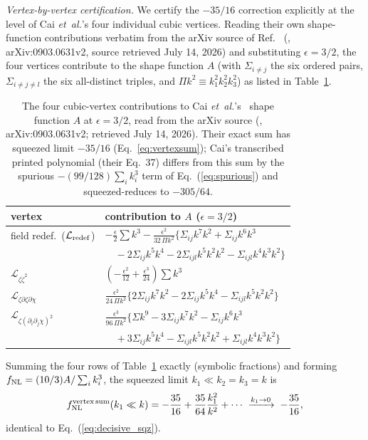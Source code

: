 \documentclass[aps,prd,twocolumn,superscriptaddress,showpacs,preprintnumbers,nofootinbib,longbibliography,floatfix]{revtex4-2}
\newcommand{\fnl}{f_{\rm NL}}
\newcommand{\etal}{\textit{et~al.}}
\begin{document}
\emph{Vertex-by-vertex certification.} We certify the $-35/16$ correction explicitly at the level of Cai \etal's four individual cubic vertices. Reading their own shape-function contributions verbatim from the arXiv source of Ref.~\cite{Cai:2009fn} (, arXiv:0903.0631v2, source retrieved July 14, 2026) and substituting $\epsilon=3/2$, the four vertices contribute to the shape function $A$ (with $\Sigma_{i\neq j}$ the six ordered pairs, $\Sigma_{i\neq j\neq l}$ the six all-distinct triples, and $\Pi k^2\equiv k_1^2k_2^2k_3^2$) as listed in Table~\ref{tab:vertices}.
\begin{table}[t]
\centering
\caption{\label{tab:vertices}The four cubic-vertex contributions to Cai \etal's~\cite{Cai:2009fn} shape function $A$ at $\epsilon=3/2$, read from the arXiv source (\protect{}, arXiv:0903.0631v2; retrieved July 14, 2026). Their exact sum has squeezed limit $-35/16$ (Eq.~\ref{eq:vertexsum}); Cai's transcribed printed polynomial (their Eq.~37) differs from this sum by the spurious $-(99/128)\sum_i k_i^3$ term of Eq.~(\ref{eq:spurious}) and squeezed-reduces to $-305/64$.}
\begin{ruledtabular}
\begin{tabular}{ll}
vertex & contribution to $A$ ($\epsilon=3/2$) \\ \hline
field redef.\ ($\mathcal{L}_{\rm redef}$) & $-\tfrac{\epsilon}{2}\sum k^3 - \tfrac{\epsilon^2}{32\,\Pi k^2}\{\Sigma_{ij}k^7k^2{+}\Sigma_{ij}k^6k^3$ \\
 & $\quad-2\Sigma_{ij}k^5k^4{-}2\Sigma_{ijl}k^5k^2k^2{-}\Sigma_{ijl}k^4k^3k^2\}$ \\
$\mathcal{L}_{\zeta\dot\zeta^2}$ & $\left(-\tfrac{\epsilon^2}{12}+\tfrac{\epsilon^3}{24}\right)\sum k^3$ \\
$\mathcal{L}_{\dot\zeta\partial\zeta\partial\chi}$ & $\tfrac{\epsilon^2}{24\,\Pi k^2}\{2\Sigma_{ij}k^7k^2-2\Sigma_{ij}k^5k^4-\Sigma_{ijl}k^5k^2k^2\}$ \\
$\mathcal{L}_{\zeta(\partial_i\partial_j\chi)^2}$ & $\tfrac{\epsilon^3}{96\,\Pi k^2}\{\Sigma k^9-3\Sigma_{ij}k^7k^2-\Sigma_{ij}k^6k^3$ \\
 & $\quad+3\Sigma_{ij}k^5k^4-\Sigma_{ijl}k^5k^2k^2+\Sigma_{ijl}k^4k^3k^2\}$ \\
\end{tabular}
\end{ruledtabular}
\end{table}
Summing the four rows of Table~\ref{tab:vertices} exactly (symbolic fractions) and forming $\fnl=(10/3)A/\sum_i k_i^3$, the squeezed limit $k_1\ll k_2=k_3=k$ is
\begin{equation}
\fnl^{\rm vertex\,sum}(k_1\ll k) = -\frac{35}{16} + \frac{35}{64}\frac{k_1^2}{k^2} + \cdots \;\xrightarrow{k_1\to0}\; -\frac{35}{16},
\label{eq:vertexsum}
\end{equation}
identical to Eq.~(\ref{eq:decisive_sqz}).
\end{document}
